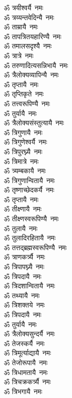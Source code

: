 \begin{flushleft}
\begin{multicols}{2}
ॐ त्रयीश्वर्यै~नमः\\
ॐ त्रय्यन्तवेदिन्यै~नमः\\
ॐ ताम्रायै~नमः\\
ॐ तापत्रितयहारिण्यै~नमः\\
ॐ तमालसदृश्यै~नमः\\
ॐ त्रात्रे~नमः\\
ॐ तरुणादित्यसन्निभायै~नमः\hfill{}\\
ॐ त्रैलोक्यव्यापिन्यै~नमः\\
ॐ तृप्तायै~नमः\\
ॐ तृप्तिकृते~नमः\\
ॐ तत्त्वरूपिण्यै~नमः\\
ॐ तुर्यायै~नमः\\
ॐ त्रैलोक्यसंस्तुत्यायै~नमः\\
ॐ त्रिगुणायै~नमः\\
ॐ त्रिगुणेश्वर्यै~नमः\\
ॐ त्रिपुरघ्न्यै~नमः\\
ॐ त्रिमात्रे~नमः\hfill{}\\
ॐ त्र्यम्बकायै~नमः\\
ॐ त्रिगुणान्वितायै~नमः\\
ॐ तृष्णाच्छेदकर्यै~नमः\\
ॐ तृप्तायै~नमः\\
ॐ तीक्ष्णायै~नमः\\
ॐ तीक्ष्णस्वरूपिण्यै~नमः\\
ॐ तुलायै~नमः\\
ॐ तुलादिरहितायै~नमः\\
ॐ तत्तद्ब्रह्मस्वरूपिण्यै~नमः\\
ॐ त्राणकर्त्र्यै~नमः\hfill{}\\
ॐ त्रिपापघ्न्यै~नमः\\
ॐ त्रिपदायै~नमः\\
ॐ त्रिदशान्वितायै~नमः\\
ॐ तथ्यायै~नमः\\
ॐ त्रिशक्तये~नमः\\
ॐ त्रिपदायै~नमः\\
ॐ तुर्यायै~नमः\\
ॐ त्रैलोक्यसुन्दर्यै~नमः\\
ॐ तेजस्कर्यै~नमः\\
ॐ त्रिमूर्त्याद्यायै~नमः\hfill{}\\
ॐ तेजोरूपायै~नमः\\
ॐ त्रिधामतायै~नमः\\
ॐ त्रिचक्रकर्त्र्यै~नमः\\
ॐ त्रिभगायै~नमः\\

\end{multicols}
\end{flushleft}
